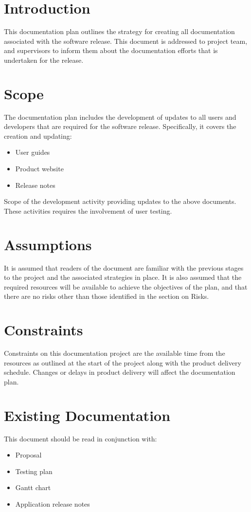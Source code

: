 \section{Introduction}
This documentation plan outlines the strategy for creating all documentation associated with the software release. This document is addressed to project team, and supervisors to inform them about the documentation efforts that is undertaken for the release.

\section{Scope}
The documentation plan includes the development of updates to all users and developers that are required for the software release. Specifically, it covers the creation and updating:
\begin{itemize}
	\item User guides
    \item Product website
	\item Release notes
\end{itemize}

Scope of the development activity providing updates to the above documents. These activities requires the involvement of user testing. 

\section{Assumptions}
It is assumed that readers of the document are familiar with the previous stages to the project and the associated strategies in place. It is also assumed that the required resources will be available to achieve the objectives of the plan, and that there are no risks other than those identified in the section on Risks.

\section{Constraints}
Constraints on this documentation project are the available time from the resources as outlined at the start of the project along with the product delivery schedule. Changes or delays in product delivery will affect the documentation plan.

\section{Existing Documentation}
This document should be read in conjunction with:
\begin{itemize}
    \item Proposal
    \item Testing plan
    \item Gantt chart
    \item Application release notes
\end{itemize}

